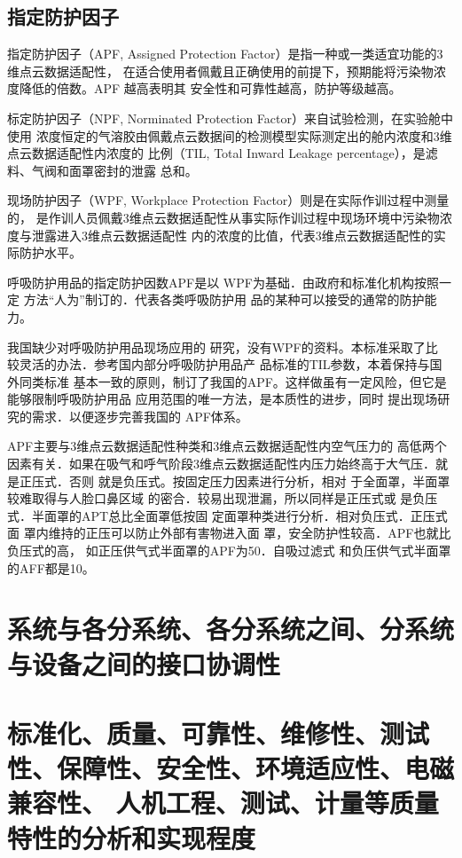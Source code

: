 \documentclass[a4paper,12pt]{ctexbook}	%
\begin{document}
\subsection{指定防护因子}

指定防护因子（APF, Assigned Protection Factor）是指一种或一类适宜功能的3维点云数据适配性，
在适合使用者佩戴且正确使用的前提下，预期能将污染物浓度降低的倍数。APF 越高表明其
安全性和可靠性越高，防护等级越高。

标定防护因子（NPF, Norminated Protection Factor）来自试验检测，在实验舱中使用
浓度恒定的气溶胶由佩戴点云数据间的检测模型实际测定出的舱内浓度和3维点云数据适配性内浓度的
比例（TIL, Total Inward Leakage percentage），是滤料、气阀和面罩密封的泄露
总和。

现场防护因子（WPF, Workplace Protection Factor）则是在实际作训过程中测量的，
是作训人员佩戴3维点云数据适配性从事实际作训过程中现场环境中污染物浓度与泄露进入3维点云数据适配性
内的浓度的比值，代表3维点云数据适配性的实际防护水平。

呼吸防护用品的指定防护因数APF是以
WPF为基础．由政府和标准化机构按照一定
方法“人为”制订的．代表各类呼吸防护用
品的某种可以接受的通常的防护能力。

我国缺少对呼吸防护用品现场应用的
研究，没有WPF的资料。本标准采取了比
较灵活的办法．参考国内部分呼吸防护用品产
品标准的TIL参数，本着保持与国外同类标准
基本一致的原则，制订了我国的APF。这样做虽有一定风险，但它是能够限制呼吸防护用品
应用范围的唯一方法，是本质性的进步，同时
提出现场研究的需求．以便逐步完善我国的
APF体系。


APF主要与3维点云数据适配性种类和3维点云数据适配性内空气压力的
高低两个因素有关．如果在吸气和呼气阶段3维点云数据适配性内压力始终高于大气压．就是正压式．否则
就是负压式。按固定压力因素进行分析，相对
于全面罩，半面罩较难取得与人脸口鼻区域
的密合．较易出现泄漏，所以同样是正压式或
是负压式．半面罩的APT总比全面罩低按固
定面罩种类进行分析．相对负压式．正压式面
罩内维持的正压可以防止外部有害物进入面
罩，安全防护性较高．APF也就比负压式的高，
如正压供气式半面罩的APF为50．自吸过滤式
和负压供气式半面罩的AFF都是10。


\section{系统与各分系统、各分系统之间、分系统与设备之间的接口协调性}

\section{标准化、质量、可靠性、维修性、测试性、保障性、安全性、环境适应性、电磁兼容性、
人机工程、测试、计量等质量特性的分析和实现程度}
\end{document}
